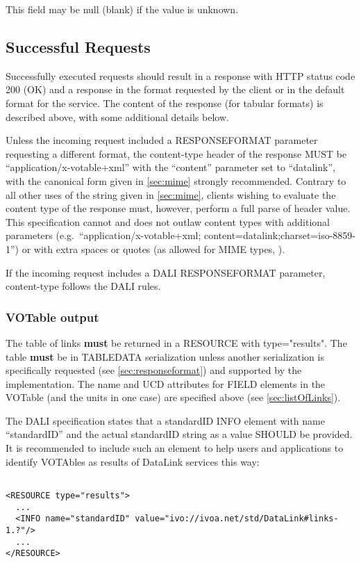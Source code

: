 \documentclass[11pt,a4paper]{ivoa}
\newcommand{\attval}[2]{#1={\allowbreak}{"}#2{"}}
\begin{document}
This field may be null (blank) if the value is unknown.

\subsection{Successful Requests}
\label{sec:successfulRequests}

Successfully executed requests should result in a response with HTTP
status code 200 (OK) and a response in the format requested by the client
or in the default format for the service. The content of the response
(for tabular formats) is described above,
with some additional details below.

Unless the incoming request included a RESPONSEFORMAT parameter requesting
a different format, the content-type header of the response MUST be
``application/x-votable+xml'' with the
``content'' parameter set to ``datalink'',
with the canonical form given in \ref{sec:mime}
strongly recommended. Contrary to
all other uses of the string given in \ref{sec:mime},
clients wishing to evaluate
the content type of the response must, however, perform a full parse
of header value. This specification cannot and does not outlaw content
types with additional parameters
(e.g.\ ``application/x-votable+xml; content=datalink;charset=iso-8859-1'')
or with extra spaces or quotes
(as allowed for MIME types, \citet{std:RFC2045}).

If the incoming request includes a DALI RESPONSEFORMAT parameter,
content-type follows the DALI rules.


\subsubsection{VOTable output}

The table of links {\bf must} be returned in a RESOURCE with
\attval{type}{results}. The table {\bf must} be in TABLEDATA serialization
unless another serialization is specifically requested
(see \ref{sec:responseformat})
and supported by the implementation.
The name and UCD attributes for FIELD elements in the VOTable
(and the units in one case) are specified above (see \ref{sec:listOfLinks}).

The DALI specification states that a standardID INFO element with
name ``standardID'' and the actual standardID string as a value SHOULD
be provided.  It is recommended to include such an element to help users
and applications to identify VOTAbles as results of DataLink services
this way:
\begin{verbatim}

<RESOURCE type="results">
  ... 
  <INFO name="standardID" value="ivo://ivoa.net/std/DataLink#links-1.?"/> 
  ... 
</RESOURCE>
\end{verbatim}
\end{document}
